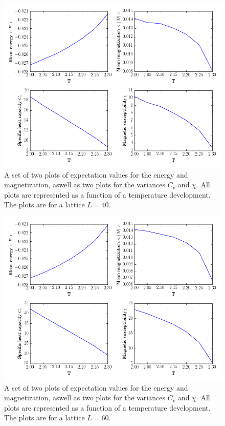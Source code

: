 \documentclass[12pt]{article}
\begin{document}
\begin{figure}[H]
\includegraphics[scale=0.5]{exp_val40.png}
\caption{A set of two plots of expectation values for the energy and magnetization, aswell as two plots for the variances $C_v$ and $\chi$. All plots are represented as a function of a temperature development. The plots are for a lattice $L = 40$.}\label{fig:exp_40}
\end{figure}


\begin{figure}[H]
\includegraphics[scale=0.5]{exp_val60.png}
\caption{A set of two plots of expectation values for the energy and magnetization, aswell as two plots for the variances $C_v$ and $\chi$. All plots are represented as a function of a temperature development. The plots are for a lattice $L = 60$.}\label{fig:exp_60}
\end{figure}
\end{document}
